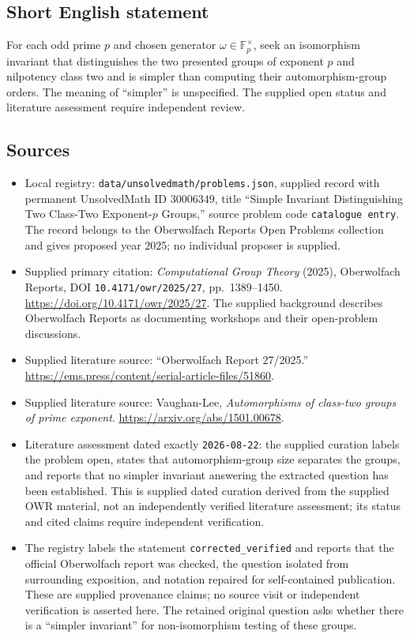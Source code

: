\documentclass[11pt]{article}
\newcommand{\F}{\mathbb{F}}
\begin{document}
\subsection{Short English statement}
For each odd prime \(p\) and chosen generator \(\omega\in\F_p^\times\), seek an isomorphism invariant that distinguishes the two presented groups of exponent \(p\) and nilpotency class two and is simpler than computing their automorphism-group orders. The meaning of ``simpler'' is unspecified. The supplied open status and literature assessment require independent review.
\subsection{Sources}
\begin{itemize}
\item Local registry: \texttt{data/unsolvedmath/problems.json}, supplied record with permanent UnsolvedMath ID \(30006349\), title ``Simple Invariant Distinguishing Two Class-Two Exponent-\(p\) Groups,'' source problem code \texttt{catalogue entry}. The record belongs to the Oberwolfach Reports Open Problems collection and gives proposed year 2025; no individual proposer is supplied.
\item Supplied primary citation: \emph{Computational Group Theory} (2025), Oberwolfach Reports, DOI \texttt{10.4171/owr/2025/27}, pp.\ 1389--1450. \url{https://doi.org/10.4171/owr/2025/27}. The supplied background describes Oberwolfach Reports as documenting workshops and their open-problem discussions.
\item Supplied literature source: ``Oberwolfach Report 27/2025.'' \url{https://ems.press/content/serial-article-files/51860}.
\item Supplied literature source: Vaughan-Lee, \emph{Automorphisms of class-two groups of prime exponent}. \url{https://arxiv.org/abs/1501.00678}.
\item Literature assessment dated exactly \texttt{2026-08-22}: the supplied curation labels the problem open, states that automorphism-group size separates the groups, and reports that no simpler invariant answering the extracted question has been established. This is supplied dated curation derived from the supplied OWR material, not an independently verified literature assessment; its status and cited claims require independent verification.
\item The registry labels the statement \texttt{corrected\_verified} and reports that the official Oberwolfach report was checked, the question isolated from surrounding exposition, and notation repaired for self-contained publication. These are supplied provenance claims; no source visit or independent verification is asserted here. The retained original question asks whether there is a ``simpler invariant'' for non-isomorphism testing of these groups.
\end{itemize}
\end{document}
